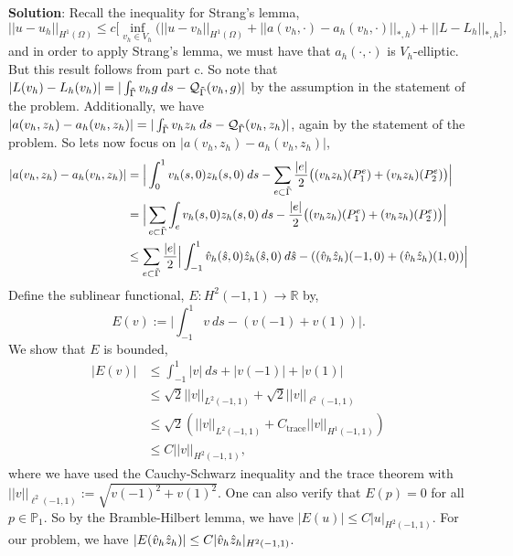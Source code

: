\documentclass[11pt]{article}
\begin{document}
{\bf Solution}: Recall the inequality for Strang's lemma,
\begin{equation*}
    ||u - u_h||_{H^1(\Omega)} \leq c \big[ \inf_{v_h \in V_h} \big( ||u - v_h||_{H^1(\Omega)} + ||a(v_h, \cdot) - a_h(v_h, \cdot)||_{*,h} \big) + ||L - L_h||_{*,h} \big],
\end{equation*}
and in order to apply Strang's lemma, we must have that $a_h(\cdot, \cdot)$ is $V_h$-elliptic.
But this result follows from part c.
So note that $|L(v_h) - L_h(v_h)| = |\int_{\Tilde{\Gamma}} v_h g \: ds - \mathcal{Q}_{\Tilde{\Gamma}}(v_h, g)|$ by the assumption in the statement of the problem.
Additionally, we have $|a(v_h, z_h) - a_h(v_h, z_h)| = |\int_{\Tilde{\Gamma}} v_h z_h \: ds - \mathcal{Q}_{\Tilde{\Gamma}}(v_h, z_h)|$, again by the statement of the problem. 
So lets now focus on $|a(v_h, z_h) - a_h(v_h, z_h)|$,
\begin{align*}
	|a(v_h, z_h) - a_h(v_h, z_h)| &= \Big|\int_0^1 v_h(s,0) z_h(s,0) \: ds - \sum_{e \subset \Tilde{\Gamma}} \frac{|e|}{2} \big((v_hz_h)(P^e_1) + (v_h z_h)(P^e_2)\big) \Big| \\
	&=  \Big| \sum_{e\subset \Tilde{\Gamma}} \int_e v_h(s,0) z_h(s,0) \: ds - \frac{|e|}{2} \big((v_h z_h)(P^e_1) + (v_h z_h)(P^e_2)\big) \Big| \\
	&\leq \sum_{e \subset \Tilde{\Gamma}} \frac{|e|}{2} \Big| \int_{-1}^1 \Hat{v}_h(\hat{s},0) \Hat{z}_h(\hat{s},0) \: d\Hat{s} - ((\hat{v}_h \hat{z}_h)(-1,0) + (\Hat{v}_h \Hat{z}_h)(1,0)) \Big|
\end{align*}
Define the sublinear functional, $E : H^2(-1,1) \to \mathbb{R}$ by,
\begin{equation*}
	E(v) := \Big|\int_{-1}^1 v \: ds - (v(-1) + v(1))\Big|.
\end{equation*}
We show that $E$ is bounded,
\begin{align*}
	|E(v)| &\leq \int_{-1}^1 |v| \: ds + |v(-1)| + |v(1)| \\
	&\leq \sqrt{2}||v||_{L^2(-1,1)} + \sqrt{2} ||v||_{\ell^2(-1,1)} \\
	&\leq \sqrt{2}(||v||_{L^2(-1,1)} + C_{\text{trace}} ||v||_{H^1(-1,1)}) \\
	&\leq C ||v||_{H^2(-1,1)},
\end{align*}
where we have used the Cauchy-Schwarz inequality and the trace theorem with $||v||_{\ell^2(-1,1)} := \sqrt{v(-1)^2 + v(1)^2}$.
One can also verify that $E(p) = 0$ for all $p \in \mathbb{P}_1$.
So by the Bramble-Hilbert lemma, we have $|E(u)| \leq C|u|_{H^2(-1,1)}$.
For our problem, we have $|E(\Hat{v}_h \Hat{z}_h)| \leq C|\Hat{v}_h \Hat{z}_h|_{H^2(-1,1)}$.
\end{document}
